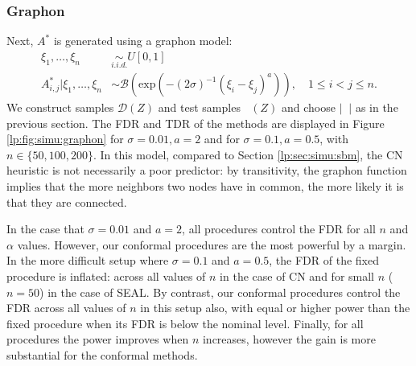 \documentclass[a4paper, 11pt]{article}
\theoremstyle{remark}
\DeclareMathOperator{\Dcal}{\cD_{\text{cal}}}
\DeclareMathOperator{\Dtest}{\cD_{\text{test}}}
\newcommand{\EM}{\ensuremath}
\newcommand{\cB}{\EM{\mathcal{B}}}
\newcommand{\cD}{\EM{\mathcal{D}}}
\begin{document}
\subsubsection{Graphon} \label{lp:sec:simu:graphon}



Next, $A^*$ is generated using a graphon model:
\begin{align*}
\xi_1, \dots, \xi_n &\underset{i.i.d.}{\sim} U[0,1] \\
A^*_{i,j} \vert \xi_1,  \dots, \xi_n &\sim \cB \left( \text{exp} (-(2 \sigma)^{-1}(\xi_i - \xi_j)^a ) \right), \quad 1 \leq i < j \leq n . 
\end{align*}
We construct samples $\cD(Z)$ and test samples $\Dtest(Z)$ and choose $\vert \Dcal \vert$ as in the previous section. The FDR and TDR of the methods are displayed in Figure \ref{lp:fig:simu:graphon} for $\sigma=0.01, a=2$ and for $\sigma=0.1, a=0.5$, with $n \in \{50, 100, 200 \}$.
In this model, compared to Section \ref{lp:sec:simu:sbm}, the CN heuristic is not necessarily a poor predictor: by transitivity, the graphon function implies that the more neighbors two nodes have in common, the more likely it is that they are connected.

In the case that $\sigma=0.01$ and $a=2$, all procedures control the FDR for all $n$ and $\alpha$ values. However, our conformal procedures are the most powerful by a margin. In the more difficult setup where $\sigma=0.1$ and $a=0.5$, the FDR of the fixed procedure is inflated: across all values of $n$ in the case of CN and for small $n$ ($n=50$) in the case of SEAL. By contrast, our conformal procedures control the FDR across all values of $n$ in this setup also, with equal or higher power than the fixed procedure when its FDR is below the nominal level. Finally, for all procedures the power improves when $n$ increases, however the gain is more substantial for the conformal methods. 
\end{document}
